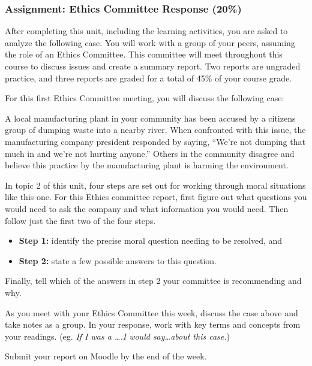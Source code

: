 \documentclass[
]{book}
\providecommand{\tightlist}{%
  \setlength{\itemsep}{0pt}\setlength{\parskip}{0pt}}
\begin{document}
\hypertarget{assignment-ethics-committee-response-20}{%
\subsubsection*{Assignment: Ethics Committee Response (20\%)}\label{assignment-ethics-committee-response-20}}

After completing this unit, including the learning activities, you are asked to
analyze the following case. You will work with a group of your peers, assuming the role of an Ethics
Committee. This committee will meet throughout this course to
discuss issues and create a summary report. Two reports are ungraded practice, and three reports are graded for a total of 45\% of your course grade.

For this first Ethics Committee meeting, you will discuss the following case:

A local manufacturing plant in your community has been accused by a citizens group of dumping waste into a nearby river. When confronted with this issue, the manufacturing company president responded by saying, ``We're not dumping that much in and we're not hurting anyone.'' Others in the community disagree and believe this practice by the manufacturing plant is harming the environment.

In topic 2 of this unit, four steps are set out for working through moral situations like this one. For this Ethics committee report, first figure out what questions you would need to ask the company and what information you would need. Then follow just the first two of the four steps.

\begin{itemize}
\tightlist
\item
  \textbf{Step 1:} identify the precise moral question needing to be resolved, and
\item
  \textbf{Step 2:} state a few possible answers to this question.
\end{itemize}

Finally, tell which of the answers in step 2 your committee is recommending and why.

As you meet with your Ethics Committee this week, discuss the case above and
take notes as a group. In your response, work with key terms and concepts from
your readings. (eg. \emph{If I was a \ldots.I would say\ldots about this case.})

Submit your report on Moodle by the end of the week.
\end{document}
